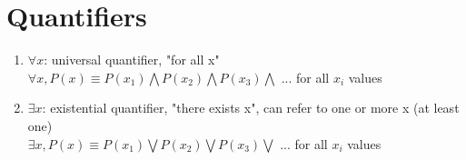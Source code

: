 \documentclass[11pt]{article}
\begin{document}
\section*{Quantifiers}
\begin{enumerate}
\item 
$\forall x$: universal quantifier, "for all x" \\
$\forall x, P(x) \equiv P({x_1}) \bigwedge P({x_2}) \bigwedge P({x_3}) \bigwedge $ ... for all ${x_i}$ values
\item
$\exists x$: existential quantifier, "there exists x", can refer to one or more x (at least one)\\
$\exists x, P(x) \equiv P({x_1}) \bigvee P({x_2}) \bigvee P({x_3}) \bigvee $ ... for all ${x_i}$ values
\end{enumerate}
\end{document}
